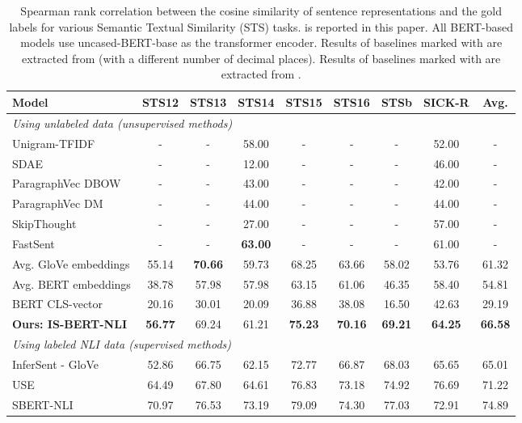 \documentclass[11pt,a4paper]{article}
\begin{document}
\begin{table*}[t]
\centering
\begin{tabular}{l|ccccccc|c}
\toprule
\textbf{Model} &\textbf{STS12} &\textbf{STS13} &\textbf{STS14} &\textbf{STS15} &\textbf{STS16} &\textbf{STSb} &\textbf{SICK-R} & \textbf{Avg.}\\
\midrule
\midrule
\multicolumn{9}{l}{\emph{Using unlabeled data (unsupervised methods)}}\\
\midrule
Unigram-TFIDF &- &- &58.00 &- &- &- &52.00 &-\\
SDAE &- &- &12.00 &- &- &- &46.00 &-\\
ParagraphVec DBOW &- &- &43.00 &- &- &- &42.00 &-\\
ParagraphVec DM &- &- &44.00 &- &- &- &44.00 &-\\
SkipThought &- &- &27.00 &- &- &- &57.00 &-\\
FastSent &- &- &\bf{63.00} &- &- &- &61.00 &-\\
Avg. GloVe embeddings &55.14 &\bf{70.66} &59.73 &68.25 &63.66 &58.02 &53.76 &61.32\\
Avg. BERT embeddings &38.78 &57.98 &57.98 &63.15 &61.06 &46.35 &58.40 &54.81\\
BERT CLS-vector &20.16 &30.01 &20.09 &36.88 &38.08 &16.50 &42.63 &29.19\\
\hline 
\textbf{Ours: IS-BERT-NLI} &\bf{56.77} &69.24 &61.21 &\bf{75.23} &\bf{70.16} &\bf{69.21} &\bf{64.25} &\bf{66.58}\\
\bottomrule
\toprule
\multicolumn{9}{l}{\emph{Using labeled NLI data (supervised methods)}}\\
\hline 
InferSent - GloVe &52.86 &66.75 &62.15 &72.77 &66.87 &68.03 &65.65 &65.01\\
USE &64.49 &67.80 &64.61 &76.83 &73.18 &74.92 &76.69 &71.22\\
SBERT-NLI &70.97 &76.53 &73.19 &79.09 &74.30 &77.03 &72.91 &74.89\\ 
\bottomrule
\end{tabular}
\caption{Spearman rank correlation  between the cosine similarity of sentence representations and the gold labels for various Semantic Textual Similarity (STS) tasks.  is reported in this paper. All BERT-based models use uncased-BERT-base as the transformer encoder. Results of baselines marked with  are extracted from \cite{hill2016} (with a different number of decimal places). Results of baselines marked with  are extracted from \cite{reimers2019}. } \label{table:sts}
\end{table*}
 
\end{document}

